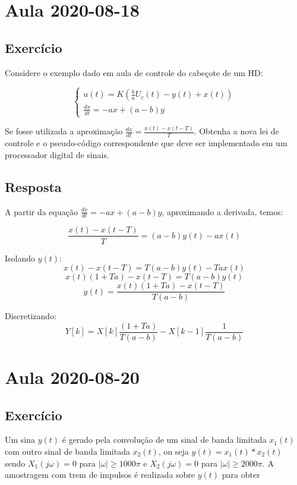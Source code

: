 \documentclass[a4paper,11pt]{article}
\title{\tituloRelatorio}
\author{Rafael Lima}
\begin{document}

\section{Aula 2020-08-18}
\subsection{Exercício}
Considere o exemplo dado em aula de controle do cabeçote de um HD:

$$
\left\{
\begin{array}{l}
    u(t) = K\left(\frac{b}{a}U_c(t) - y(t) + x(t)\right)\\
    \frac{dx}{dt} = -ax + (a-b)y
\end{array}
\right.
$$

Se fosse utilizada a aproximação $\frac{dx}{dt} = \frac{x(t)- x(t-T)}{T}$. Obtenha a nova lei de controle e o pseudo-código correspondente que deve ser implementado em um processador digital de sinais.

\subsection{Resposta}

A partir da equação $\frac{dx}{dt} = -ax + (a-b)y$, aproximando a derivada, temos:

$$\frac{x(t) - x(t-T)}{T} = (a-b) y(t) - a x(t)$$

Isolando $y(t)$:
$$x(t) - x(t-T) = T (a-b) y(t) - T a x(t)$$
$$x(t)( 1 + T a) - x(t-T) = T (a-b) y(t)$$
$$y(t) =\frac{x(t)( 1 + T a) - x(t-T)}{T (a-b)}$$

Discretizando:
\begin{equation}
Y[k] = X[k]\frac{( 1 + T a)}{{T (a-b)}} - X[k-1]\frac{1}{{T (a-b)}}
\end{equation}
\section{Aula 2020-08-20}
 \subsection{Exercício}
 Um sina $y(t)$ é gerado pela convolução de um sinal de banda limitada $x_1(t)$ com outro sinal de banda limitada $x_2(t)$, ou seja $y(t)=x_1(t)*x_2(t)$ sendo $X_1(j\omega) = 0$ para $|\omega| \geq 1000\pi$ e $X_2(j\omega) = 0$ para $|\omega| \geq 2000\pi$. A amostragem com trem de impulsos é realizada sobre $y(t)$ para obter
 
\end{document}
